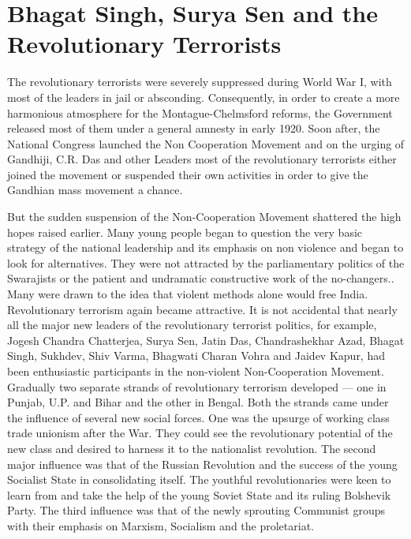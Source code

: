 \chapter[The Revolutionary Terrorist]{Bhagat Singh, Surya Sen and the Revolutionary Terrorists}



The revolutionary terrorists were severely suppressed during World War I, with most of the leaders in jail or absconding. Consequently, in order to create a more harmonious atmosphere for the Montague-Chelmsford reforms, the Government released most of them under a general amnesty in early 1920. Soon after, the National Congress launched the Non Cooperation Movement and on the urging of Gandhiji, C.R. Das and other Leaders most of the revolutionary terrorists either joined the movement or suspended their own activities in order to give the Gandhian mass movement a chance.

But the sudden suspension of the Non-Cooperation Movement shattered the high hopes raised earlier. Many young people began to question the very basic strategy of the national leadership and its emphasis on non violence and began to look for alternatives. They were not attracted by the parliamentary politics of the Swarajists or the patient and undramatic constructive work of the no-changers.. Many were drawn to the idea that violent methods alone would free India. Revolutionary terrorism again became attractive. It is not accidental that nearly all the major new leaders of the revolutionary terrorist politics, for example, Jogesh Chandra Chatterjea, Surya Sen, Jatin Das, Chandrashekhar Azad, Bhagat Singh, Sukhdev, Shiv Varma, Bhagwati Charan Vohra and Jaidev Kapur, had been enthusiastic participants in the non-violent Non-Cooperation Movement. Gradually two separate strands of revolutionary terrorism developed --- one in Punjab, U.P. and Bihar and the other in Bengal. Both the strands came under the influence of several new social forces. One was the upsurge of working class trade unionism after the War. They could see the revolutionary potential of the new class and desired to harness it to the nationalist revolution. The second major influence was that of the Russian Revolution and the success of the young Socialist State in consolidating itself. The youthful revolutionaries were keen to learn from and take the help of the young Soviet State and its ruling Bolshevik Party. The third influence was that of the newly sprouting Communist groups with their emphasis on Marxism, Socialism and the proletariat.

